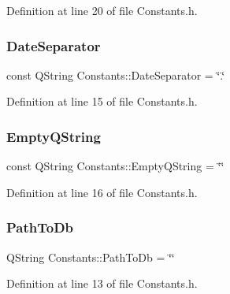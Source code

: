 Definition at line 20 of file Constants.\+h.

\hypertarget{classConstants_a1b884c97c8f0c86fa5f8e050e38deca4}{}\label{classConstants_a1b884c97c8f0c86fa5f8e050e38deca4} 
\subsubsection{\texorpdfstring{Date\+Separator}{DateSeparator}}
{\footnotesize\ttfamily const Q\+String Constants\+::\+Date\+Separator = \char`\"{}.\char`\"{}\hspace{0.3cm}{\ttfamily [static]}}



Definition at line 15 of file Constants.\+h.

\hypertarget{classConstants_a60b54ff297949426391e55991f80ccf2}{}\label{classConstants_a60b54ff297949426391e55991f80ccf2} 
\subsubsection{\texorpdfstring{Empty\+Q\+String}{EmptyQString}}
{\footnotesize\ttfamily const Q\+String Constants\+::\+Empty\+Q\+String = \char`\"{}\char`\"{}\hspace{0.3cm}{\ttfamily [static]}}



Definition at line 16 of file Constants.\+h.

\hypertarget{classConstants_a2a8fc008322275c6dfbc1f18a781c405}{}\label{classConstants_a2a8fc008322275c6dfbc1f18a781c405} 
\subsubsection{\texorpdfstring{Path\+To\+Db}{PathToDb}}
{\footnotesize\ttfamily Q\+String Constants\+::\+Path\+To\+Db = \char`\"{}\char`\"{}\hspace{0.3cm}{\ttfamily [static]}}



Definition at line 13 of file Constants.\+h.

\hypertarget{classConstants_aeade44a42999a2037171cc8b04031edb}{}\label{classConstants_aeade44a42999a2037171cc8b04031edb} 
